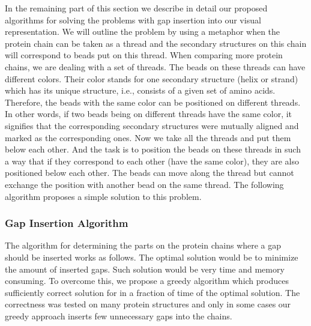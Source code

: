 \documentclass[twocolumn]{bmcart}%
\begin{document}
In the remaining part of this section we describe in detail our proposed algorithms for solving the problems with gap insertion into our visual representation.
We will outline the problem by using a metaphor when the protein chain can be taken as a thread and the secondary structures on this chain will correspond to beads put on this thread.
When comparing more protein chains, we are dealing with a set of threads. 
The beads on these threads can have different colors. 
Their color stands for one secondary structure (helix or strand) which has its unique structure, i.e., consists of a given set of amino acids.
Therefore, the beads with the same color can be positioned on different threads.
In other words, if two beads being on different threads have the same color, it signifies that the corresponding secondary structures were mutually aligned and marked as the corresponding ones. 
Now we take all the threads and put them below each other.
And the task is to position the beads on these threads in such a way that if they correspond to each other (have the same color), they are also positioned below each other. 
The beads can move along the thread but cannot exchange the position with another bead on the same thread.
The following algorithm proposes a simple solution to this problem.


\subsubsection*{Gap Insertion Algorithm}
\label{sec:alg}
The algorithm for determining the parts on the protein chains where a gap should be inserted works as follows. 
The optimal solution would be to minimize the amount of inserted gaps.
Such solution would be very time and memory consuming.
To overcome this, we propose a greedy algorithm which produces sufficiently correct solution for in a fraction of time of the optimal solution.
The correctness was tested on many protein structures and only in some cases our greedy approach inserts few unnecessary gaps into the chains.
\end{document}
